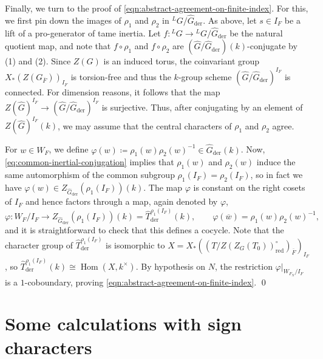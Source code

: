 \documentclass[reqno]{amsart}
\numberwithin{equation}{subsection}
\newcommand{\ol}[1]{\overline{#1}}
\newcommand{\wh}[1]{\widehat{#1}}
\newcommand{\co}{\colon}
\newcommand{\ld}{{}^L}
\DeclareMathOperator{\Hom}{Hom}
\DeclareMathOperator{\red}{red}
\DeclareMathOperator{\der}{der}
\theoremstyle{remark}
\newtheorem{remark}[thm]{Remark}
\numberwithin{equation}{subsection}
\numberwithin{figure}{subsection}
\begin{document}
Finally, we turn to the proof of \eqref{eqn:abstract-agreement-on-finite-index}. For this, we first pin down the images of $\rho_1$ and $\rho_2$ in $\ld G / \wh{G}_{\der}$. As above, let $s \in I_F$ be a lift of a pro-generator of tame inertia. Let $f\co \ld G \to \ld G/\wh G_{\der}$ be the natural quotient map, and note that $f \circ \rho_1$ and $f \circ \rho_2$ are $(\wh G/\wh G_{\der})(k)$-conjugate by (1) and (2). Since $Z(G)$ is an induced torus, the coinvariant group $X_*(Z(G_{\ol F}))_{I_F}$ is torsion-free and thus the $k$-group scheme $(\wh G/\wh G_{\der})^{I_F}$ is connected. For dimension reasons, it follows that the map $Z(\wh G)^{I_F} \to (\wh G/\wh G_{\der})^{I_F}$ is surjective. Thus, after conjugating by an element of $Z(\wh G)^{I_F}(k)$, we may assume that the central characters of $\rho_1$ and $\rho_2$ agree.



For $w \in W_F$, we define $\varphi(w)\coloneqq\rho_1(w)\rho_2(w)^{-1} \in \wh G_{\der}(k)$. Now, \eqref{eq:common-inertial-conjugation} implies that $\rho_1(w)$ and $\rho_2(w)$ induce the same automorphism of the common subgroup $\rho_1(I_F)=\rho_2(I_F)$, so in fact we have $\varphi(w)\in Z_{\wh G_{\der}}(\rho_1(I_F))(k)$. The map $\varphi$ is constant on the right cosets of $I_F$ and hence factors through a map, again denoted by $\varphi$,
\[
\varphi\co W_F/I_F\longrightarrow Z_{\wh G_{\der}}(\rho_1(I_F))(k) = \wh T_{\der}^{\rho_1(I_F)}(k),
\qquad
\varphi(\ol w)=\rho_1(w)\rho_2(w)^{-1},
\]
and it is straightforward to check that this defines a cocycle. Note that the character group of $\wh T_{\der}^{\rho_1(I_F)}$ is isomorphic to $X = X_*((T/Z(Z_G(T_0))^\circ_{\red})_{\ol F})_{I_F}$, so $\wh T_{\der}^{\rho_1(I_F)}(k) \cong \Hom(X, k^\times)$. By hypothesis on $N$, the restriction $\varphi|_{W_{F_N}/I_F}$ is a $1$-coboundary, proving \eqref{eqn:abstract-agreement-on-finite-index}.
\qed 











\appendix
\section{Some calculations with sign characters}\label{app:rootwise-sign-chi-calculations}
\end{document}
